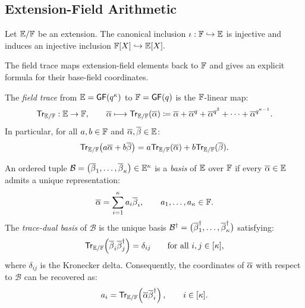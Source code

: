 \subsection{Extension-Field Arithmetic}

\begin{fact}
\label{fact:injective}
Let\/ \(\mathbb{E}/{\mathbb{F}}\) be an extension.
The canonical inclusion
\(
    \iota:{\mathbb{F}}\hookrightarrow\mathbb{E}
\)
is injective and induces an injective inclusion
\(
    {\mathbb{F}}[X]\hookrightarrow\mathbb{E}[X].
\)
\end{fact}

The field trace maps extension-field elements back to \({\mathbb{F}}\)
and gives an explicit formula for their base-field coordinates.
\begin{definition}
\label{def:trace}
The \emph{field trace} from \(\mathbb{E} = \mathsf{GF}(q^\kappa)\) to \({\mathbb{F}} = \mathsf{GF}(q)\)
is the \({\mathbb{F}}\)-linear map:
\[
    \mathsf{Tr}_{\mathbb{E}/{\mathbb{F}}}:\mathbb{E}\to{\mathbb{F}},
    \qquad
    \overline{\alpha}
    \longmapsto
    \mathsf{Tr}_{\mathbb{E}/{\mathbb{F}}}(\overline{\alpha})
    \coloneqq \overline{\alpha} + \overline{\alpha}^q + \overline{\alpha}^{q^2} + \cdots + \overline{\alpha}^{q^{\kappa-1}}.
\]
In particular, for all \(a,b\in{\mathbb{F}}\) and
\(\overline{\alpha},\overline{\beta}\in\mathbb{E}\):
\[
    \mathsf{Tr}_{\mathbb{E}/{\mathbb{F}}}\!\left(
        a\overline{\alpha}+b\overline{\beta}
    \right)
    =
    a\mathsf{Tr}_{\mathbb{E}/{\mathbb{F}}}(\overline{\alpha})
    +
    b\mathsf{Tr}_{\mathbb{E}/{\mathbb{F}}}(\overline{\beta}).
\]
\end{definition}

\begin{definition}
\label{def:basis}
An ordered tuple
\(
    \mathcal B
    =
    \bigl(
        \overline{\beta}_1,\ldots,\overline{\beta}_\kappa
    \bigr)
    \in\mathbb{E}^\kappa
\)
is a \emph{basis} of \(\mathbb{E}\) over \({\mathbb{F}}\) if every
\(\overline{\alpha}\in\mathbb{E}\) admits a unique representation:
\[
    \overline{\alpha}
    =
    \sum_{i=1}^{\kappa}a_i\overline{\beta}_i,
    \qquad
    a_1,\ldots,a_\kappa\in{\mathbb{F}}.
\]
The \emph{trace-dual basis} of \(\mathcal B\) is the unique basis
\(
    \mathcal B^\dagger
    =
    \bigl(
        \overline{\beta}_1^\dagger,\ldots,
        \overline{\beta}_\kappa^\dagger
    \bigr)
\)
satisfying:
\[
    \mathsf{Tr}_{\mathbb{E}/{\mathbb{F}}}\!\left(
        \overline{\beta}_i\overline{\beta}_j^\dagger
    \right)
    =
    \delta_{ij}
    \qquad
    \text{for all }i,j\in[\kappa],
\]
where \(\delta_{ij}\) is the Kronecker delta. Consequently, the
coordinates of \(\overline{\alpha}\) with respect to \(\mathcal B\)
can be recovered as:
\[
    a_i
    =
    \mathsf{Tr}_{\mathbb{E}/{\mathbb{F}}}\!\left(
        \overline{\alpha}\overline{\beta}_i^\dagger
    \right),
    \qquad
    i\in[\kappa].
\]
\end{definition}

